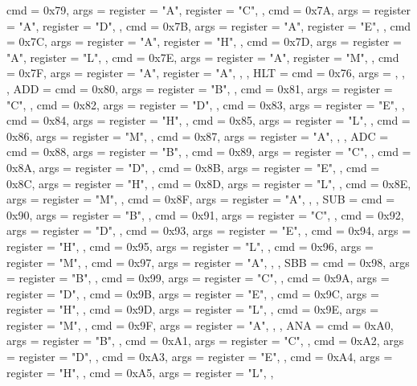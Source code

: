 {{        { cmd = 0x79, args = {{register = "A"}, {register = "C"}}, },
        { cmd = 0x7A, args = {{register = "A"}, {register = "D"}}, },
        { cmd = 0x7B, args = {{register = "A"}, {register = "E"}}, },
        { cmd = 0x7C, args = {{register = "A"}, {register = "H"}}, },
        { cmd = 0x7D, args = {{register = "A"}, {register = "L"}}, },
        { cmd = 0x7E, args = {{register = "A"}, {register = "M"}}, },
        { cmd = 0x7F, args = {{register = "A"}, {register = "A"}}, },
    },
    HLT  = {
        {cmd = 0x76, args = {}, },
    },
    ADD  = {
        { cmd = 0x80, args = {{register = "B"}}, },
        { cmd = 0x81, args = {{register = "C"}}, },
        { cmd = 0x82, args = {{register = "D"}}, },
        { cmd = 0x83, args = {{register = "E"}}, },
        { cmd = 0x84, args = {{register = "H"}}, },
        { cmd = 0x85, args = {{register = "L"}}, },
        { cmd = 0x86, args = {{register = "M"}}, },
        { cmd = 0x87, args = {{register = "A"}}, },
    },
    ADC  = {
        { cmd = 0x88, args = {{register = "B"}}, },
        { cmd = 0x89, args = {{register = "C"}}, },
        { cmd = 0x8A, args = {{register = "D"}}, },
        { cmd = 0x8B, args = {{register = "E"}}, },
        { cmd = 0x8C, args = {{register = "H"}}, },
        { cmd = 0x8D, args = {{register = "L"}}, },
        { cmd = 0x8E, args = {{register = "M"}}, },
        { cmd = 0x8F, args = {{register = "A"}}, },
    },
    SUB  = {
        { cmd = 0x90, args = {{register = "B"}}, },
        { cmd = 0x91, args = {{register = "C"}}, },
        { cmd = 0x92, args = {{register = "D"}}, },
        { cmd = 0x93, args = {{register = "E"}}, },
        { cmd = 0x94, args = {{register = "H"}}, },
        { cmd = 0x95, args = {{register = "L"}}, },
        { cmd = 0x96, args = {{register = "M"}}, },
        { cmd = 0x97, args = {{register = "A"}}, },
    },
    SBB  = {
        { cmd = 0x98, args = {{register = "B"}}, },
        { cmd = 0x99, args = {{register = "C"}}, },
        { cmd = 0x9A, args = {{register = "D"}}, },
        { cmd = 0x9B, args = {{register = "E"}}, },
        { cmd = 0x9C, args = {{register = "H"}}, },
        { cmd = 0x9D, args = {{register = "L"}}, },
        { cmd = 0x9E, args = {{register = "M"}}, },
        { cmd = 0x9F, args = {{register = "A"}}, },
    },
    ANA  = {
        { cmd = 0xA0, args = {{register = "B"}}, },
        { cmd = 0xA1, args = {{register = "C"}}, },
        { cmd = 0xA2, args = {{register = "D"}}, },
        { cmd = 0xA3, args = {{register = "E"}}, },
        { cmd = 0xA4, args = {{register = "H"}}, },
        { cmd = 0xA5, args = {{register = "L"}}, },
}}
